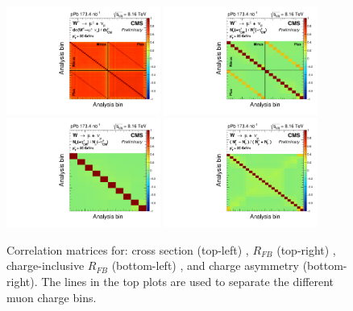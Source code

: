 \begin{figure}[htb!]
 \centering
 \includegraphics[width=0.45\textwidth]{Figures/WBoson/Analysis/CovarianceMatrix/corMatrix_WToMuPl_PA_Cross_Section_Total_Total.pdf}
 \includegraphics[width=0.45\textwidth]{Figures/WBoson/Analysis/CovarianceMatrix/corMatrix_WToMuPl_PA_ForwardBackward_Ratio_Total_Total.pdf}
 \includegraphics[width=0.45\textwidth]{Figures/WBoson/Analysis/CovarianceMatrix/corMatrix_WToMu_PA_ForwardBackward_Ratio_Total_Total.pdf}
 \includegraphics[width=0.45\textwidth]{Figures/WBoson/Analysis/CovarianceMatrix/corMatrix_WToMu_PA_Charge_Asymmetry_Total_Total.pdf}
 \caption{Correlation matrices for: \Wpm cross section (top-left) , \Wpm $R_{FB}$ (top-right) , charge-inclusive $R_{FB}$ (bottom-left) , and charge asymmetry (bottom-right). The lines in the top plots are used to separate the different muon charge bins.}
 \label{fig:CorrelationMatrix}
\end{figure}


